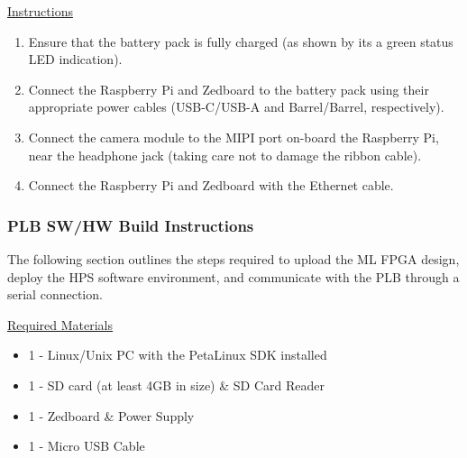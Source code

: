 \documentclass[10pt,letterpaper]{article}
\begin{document}
\underline{Instructions}
\begin{enumerate}
\item Ensure that the battery pack is fully charged (as shown by its a green status LED indication).
\item Connect the Raspberry Pi and Zedboard to the battery pack using their appropriate power cables (USB-C/USB-A and Barrel/Barrel, respectively).
\item Connect the camera module to the MIPI port on-board the Raspberry Pi, near the headphone jack (taking care not to damage the ribbon cable).
\item Connect the Raspberry Pi and Zedboard with the Ethernet cable.
\end{enumerate}

\subsubsection{PLB SW/HW Build Instructions}
\label{plb_setup}
The following section outlines the steps required to upload the ML FPGA design, deploy the HPS software environment, and communicate with the PLB through a serial connection.

\underline{Required Materials}
\begin{itemize}
\item 1 - Linux/Unix PC with the PetaLinux SDK\cite{petalinux} installed
\item 1 - SD card (at least 4GB in size) \& SD Card Reader
\item 1 - Zedboard \& Power Supply
\item 1 - Micro USB Cable
\end{itemize}
\end{document}
